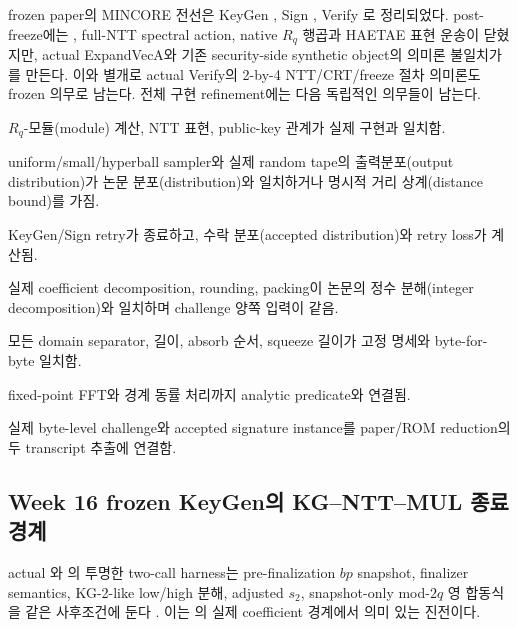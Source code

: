 frozen paper의 MINCORE 전선은 KeyGen , Sign
, Verify \FrozenPaperGate 로 정리되었다.
post-freeze에는 , full-NTT spectral action,
native \(R_q\) 행곱과 HAETAE 표현 운송이 닫혔지만, actual ExpandVecA와 기존
security-side synthetic object의 의미론 불일치가 \CurrentGate 를 만든다.
이와 별개로 actual Verify의 2-by-4 NTT/CRT/freeze 절차 의미론도 frozen
의무로 남는다. 전체 구현 refinement에는 다음 독립적인 의무들이 남는다.

\begin{description}[leftmargin=39mm,style=nextline]
  \item[public-key algebra/NTT]
    \(R_q\)-모듈(module) 계산, NTT 표현, public-key 관계가 실제 구현과 일치함.
  \item[sampler distribution]
    uniform/small/hyperball sampler와 실제 random tape의 출력분포(output
    distribution)가 논문 분포(distribution)와 일치하거나 명시적 거리
    상계(distance bound)를 가짐.
  \item[rejection과 종료]
    KeyGen/Sign retry가 종료하고, 수락 분포(accepted distribution)와 retry loss가
    계산됨.
  \item[highbits/LSB]
    실제 coefficient decomposition, rounding, packing이 논문의
    정수 분해(integer decomposition)와
    일치하며 challenge 양쪽 입력이 같음.
  \item[FIPS202 transcript]
    모든 domain separator, 길이, absorb 순서, squeeze 길이가 고정 명세와
    byte-for-byte 일치함.
  \item[FFT tie policy]
    fixed-point FFT와 경계 동률 처리까지 analytic predicate와 연결됨.
  \item[two-transcript extraction]
    실제 byte-level challenge와 accepted signature instance를 paper/ROM reduction의
    두 transcript 추출에 연결함.
\end{description}

\subsection{Week 16 frozen KeyGen의 KG--NTT--MUL 종료 경계}

actual 와 의
투명한 two-call harness는 pre-finalization \(bp\) snapshot, finalizer semantics,
KG-2-like low/high 분해, adjusted \(s_2\), snapshot-only mod-\(2q\) 영 합동식을
같은 사후조건에 둔다
\cite{week16-mincore-plan,week16-kg-report,week16-kg-ntt-mul-report}. 이는
의 실제 coefficient 경계에서 의미 있는
\statuspartial 진전이다.

